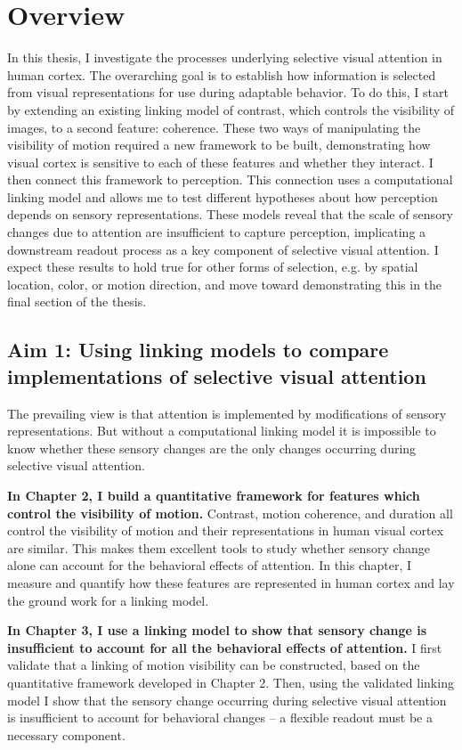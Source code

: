 \section{Overview}

In this thesis, I investigate the processes underlying selective visual attention in human cortex. The overarching goal is to establish how information is selected from visual representations for use during adaptable behavior. To do this, I start by extending an existing linking model of contrast, which controls the visibility of images, to a second feature: coherence. These two ways of manipulating the visibility of motion required a new framework to be built, demonstrating how visual cortex is sensitive to each of these features and whether they interact. I then connect this framework to perception. This connection uses a computational linking model and allows me to test different hypotheses about how perception depends on sensory representations. These models reveal that the scale of sensory changes due to attention are insufficient to capture perception, implicating a downstream readout process as a key component of selective visual attention. I expect these results to hold true for other forms of selection, e.g. by spatial location, color, or motion direction, and move toward demonstrating this in the final section of the thesis.

\subsection{Aim 1: Using linking models to compare implementations of selective visual attention}

The prevailing view is that attention is implemented by modifications of sensory representations. But without a computational linking model it is impossible to know whether these sensory changes are the only changes occurring during selective visual attention. 

\textbf{In Chapter 2, I build a quantitative framework for features which control the visibility of motion.} Contrast, motion coherence, and duration all control the visibility of motion and their representations in human visual cortex are similar. This makes them excellent tools to study whether sensory change alone can account for the behavioral effects of attention. In this chapter, I measure and quantify how these features are represented in human cortex and lay the ground work for a linking model.

\textbf{In Chapter 3, I use a linking model to show that sensory change is insufficient to account for all the behavioral effects of attention.} I first validate that a linking of motion visibility can be constructed, based on the quantitative framework developed in Chapter 2. Then, using the validated linking model I show that the sensory change occurring during selective visual attention is insufficient to account for behavioral changes -- a flexible readout must be a necessary component.

